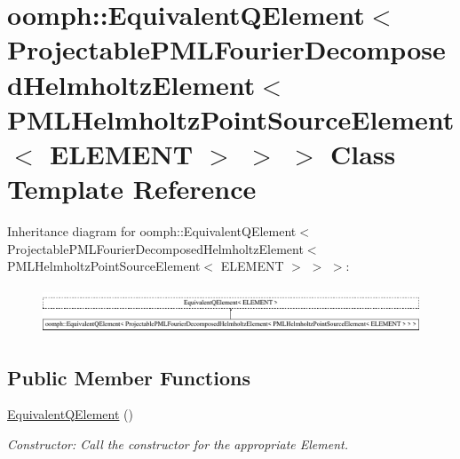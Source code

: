 \hypertarget{classoomph_1_1EquivalentQElement_3_01ProjectablePMLFourierDecomposedHelmholtzElement_3_01PMLHelmea655fba41d5fa485ebddcd1b3c02e7e}{}\section{oomph\+:\+:Equivalent\+Q\+Element$<$ Projectable\+P\+M\+L\+Fourier\+Decomposed\+Helmholtz\+Element$<$ P\+M\+L\+Helmholtz\+Point\+Source\+Element$<$ E\+L\+E\+M\+E\+NT $>$ $>$ $>$ Class Template Reference}
\label{classoomph_1_1EquivalentQElement_3_01ProjectablePMLFourierDecomposedHelmholtzElement_3_01PMLHelmea655fba41d5fa485ebddcd1b3c02e7e}
Inheritance diagram for oomph\+:\+:Equivalent\+Q\+Element$<$ Projectable\+P\+M\+L\+Fourier\+Decomposed\+Helmholtz\+Element$<$ P\+M\+L\+Helmholtz\+Point\+Source\+Element$<$ E\+L\+E\+M\+E\+NT $>$ $>$ $>$\+:\begin{figure}[H]
\begin{center}
\leavevmode
\includegraphics[height=1.398252cm]{classoomph_1_1EquivalentQElement_3_01ProjectablePMLFourierDecomposedHelmholtzElement_3_01PMLHelmea655fba41d5fa485ebddcd1b3c02e7e}
\end{center}
\end{figure}
\subsection*{Public Member Functions}
\begin{DoxyCompactItemize}
\item 
\hyperlink{classoomph_1_1EquivalentQElement_3_01ProjectablePMLFourierDecomposedHelmholtzElement_3_01PMLHelmea655fba41d5fa485ebddcd1b3c02e7e_a05c08c65ab04f51b45a05c8e7aa11389}{Equivalent\+Q\+Element} ()
\begin{DoxyCompactList}\small\item\em Constructor\+: Call the constructor for the appropriate Element. \end{DoxyCompactList}\end{DoxyCompactItemize}


